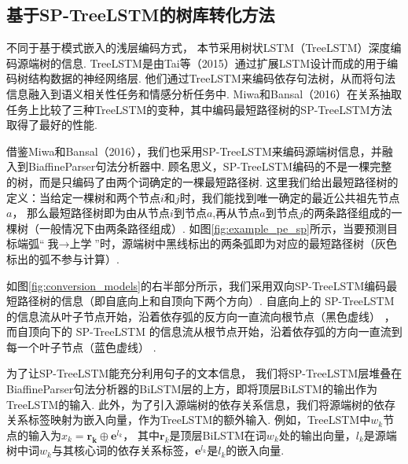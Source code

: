 \subsection{基于SP-TreeLSTM的树库转化方法}
不同于基于模式嵌入的浅层编码方式，
本节采用树状LSTM（TreeLSTM）深度编码源端树的信息.
TreeLSTM是由Tai等（2015）通过扩展LSTM设计而成的用于编码树结构数据的神经网络层.
他们通过TreeLSTM来编码依存句法树，从而将句法信息融入到语义相关性任务和情感分析任务中.
Miwa和Bansal（2016）在关系抽取任务上比较了三种TreeLSTM的变种，其中编码最短路径树的SP-TreeLSTM方法取得了最好的性能.

借鉴Miwa和Bansal（2016），我们也采用SP-TreeLSTM来编码源端树信息，并融入到BiaffineParser句法分析器中.
顾名思义，SP-TreeLSTM编码的不是一棵完整的树，而是只编码了由两个词确定的一棵最短路径树.
这里我们给出最短路径树的定义：当给定一棵树和两个节点$i$和$j$时，我们能找到唯一确定的最近公共祖先节点$a$，
那么最短路径树即为由从节点$i$到节点$a$,再从节点$a$到节点$j$的两条路径组成的一棵树（一般情况下由两条路径组成）.
如图\ref{fig:example_pe_sp}所示，当要预测目标端弧“$\mbox{我}\rightarrow \mbox{上学}$”时，源端树中黑线标出的两条弧即为对应的最短路径树（灰色标出的弧不参与计算）.

如图\ref{fig:conversion_models}的右半部分所示，我们采用双向SP-TreeLSTM编码最短路径树的信息（即自底向上和自顶向下两个方向）.
自底向上的 SP-TreeLSTM 的信息流从叶子节点开始，沿着依存弧的反方向一直流向根节点（黑色虚线） ，
而自顶向下的 SP-TreeLSTM 的信息流从根节点开始，沿着依存弧的方向一直流到每一个叶子节点（蓝色虚线） .

为了让SP-TreeLSTM能充分利用句子的文本信息，
我们将SP-TreeLSTM层堆叠在BiaffineParser句法分析器的BiLSTM层的上方，即将顶层BiLSTM的输出作为TreeLSTM的输入.
此外，为了引入源端树的依存关系信息，我们将源端树的依存关系标签映射为嵌入向量，作为TreeLSTM的额外输入.
例如，TreeLSTM中$w_k$节点的输入为$x_k=
    \mathbf{r_k} \oplus \mathbf{e}^{l_k}$，
其中$\mathbf{r}_k$是顶层BiLSTM在词$w_k$处的输出向量，$l_k$是源端树中词$w_k$与其核心词的依存关系标签，$\mathbf{e}^{l_k}$是$l_k$的嵌入向量.


